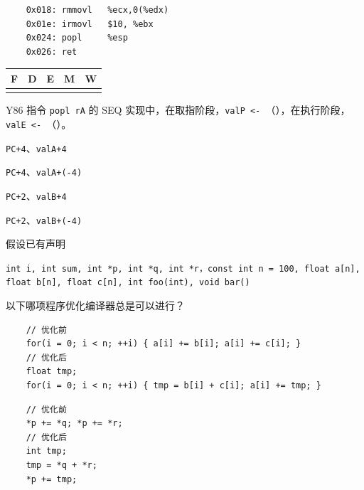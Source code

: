 \begin{problems}
            \begin{verbatim}
    0x018: rmmovl   %ecx,0(%edx)
    0x01e: irmovl   $10, %ebx
    0x024: popl     %esp
    0x026: ret
            \end{verbatim}
            \begin{table}[H]
                \centering
                \begin{tabular}{|c|c|c|c|c|}
                    \hline
                    F & D & E & M & W \\ \hline
                    {\qquad \qquad} & {\qquad \qquad} & {\qquad \qquad} & {\qquad \qquad} & {\qquad \qquad} \\ \hline
                \end{tabular}
            \end{table}
         Y86 指令 \verb|popl rA| 的 SEQ 实现中，在取指阶段，\verb|valP <- |（\quad），在执行阶段，\verb|valE <- |（\quad）。
        \begin{choices}
            \item \verb|PC+4|、\verb|valA+4|
            \item \verb|PC+4|、\verb|valA+(-4)|
            \item \verb|PC+2|、\verb|valB+4|
            \item \verb|PC+2|、\verb|valB+(-4)|
        \end{choices}
         假设已有声明
        \begin{center}
            \tt int i, int sum, int *p, int *q, int *r，const int n = 100, float a[n], float b[n], float c[n], int foo(int), void bar()
        \end{center}
        以下哪项程序优化编译器总是可以进行？
        \vspace{\baselineskip}
        \begin{choices}
            \item \begin{verbatim}
    // 优化前
    for(i = 0; i < n; ++i) { a[i] += b[i]; a[i] += c[i]; }
    // 优化后
    float tmp;
    for(i = 0; i < n; ++i) { tmp = b[i] + c[i]; a[i] += tmp; }
            \end{verbatim}
            \item \begin{verbatim}
    // 优化前
    *p += *q; *p += *r;
    // 优化后
    int tmp;
    tmp = *q + *r;
    *p += tmp;
            \end{verbatim}

\end{choices}
\end{problems}
